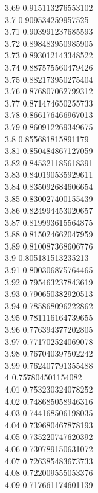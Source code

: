 {3.69	0.915113276553102\\
3.7	0.909534259957525\\
3.71	0.903991237685593\\
3.72	0.898483950985905\\
3.73	0.893012143348522\\
3.74	0.887575560479426\\
3.75	0.882173950275404\\
3.76	0.876807062799312\\
3.77	0.871474650255733\\
3.78	0.866176466967013\\
3.79	0.860912269349675\\
3.8	0.855681815891179\\
3.81	0.850484867127059\\
3.82	0.845321185618391\\
3.83	0.840190535929611\\
3.84	0.835092684606654\\
3.85	0.830027400155439\\
3.86	0.824994453020657\\
3.87	0.819993615564875\\
3.88	0.815024662047959\\
3.89	0.810087368606776\\
3.9	0.805181513235213\\
3.91	0.800306875764465\\
3.92	0.795463237843619\\
3.93	0.790650382920513\\
3.94	0.785868096222862\\
3.95	0.781116164739655\\
3.96	0.776394377202805\\
3.97	0.771702524069078\\
3.98	0.767040397502242\\
3.99	0.762407791355488\\
4	0.757804501154082\\
4.01	0.753230324078252\\
4.02	0.748685058946316\\
4.03	0.744168506198035\\
4.04	0.739680467878193\\
4.05	0.735220747620392\\
4.06	0.730789150631072\\
4.07	0.726385483673733\\
4.08	0.722009555053376\\
4.09	0.717661174601139\\
}
